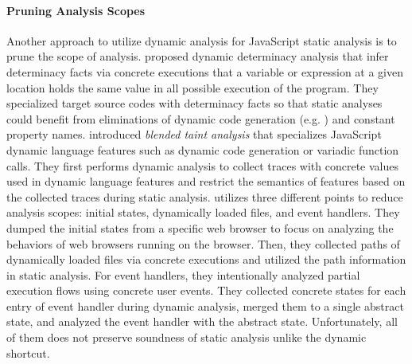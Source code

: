 \paragraph{Pruning Analysis Scopes}
Another approach to utilize dynamic analysis for JavaScript static analysis is
to prune the scope of analysis.  \citet{determinacy} proposed dynamic
determinacy analysis that infer determinacy facts via concrete executions that a
variable or expression at a given location holds the same value in all possible
execution of the program.  They specialized target source codes with determinacy
facts so that static analyses could benefit from eliminations of dynamic code
generation (e.g. ) and constant property names.  \citet{blended}
introduced \textit{blended taint analysis} that specializes JavaScript dynamic
language features such as dynamic code generation or variadic function calls.
They first performs dynamic analysis to collect traces with concrete values used
in dynamic language features and restrict the semantics of features based on the
collected traces during static analysis.  \citet{battles, eha} utilizes three
different points to reduce analysis scopes: initial states, dynamically loaded
files, and event handlers.  They dumped the initial states from a specific web
browser to focus on analyzing the behaviors of web browsers running on the
browser.  Then, they collected paths of dynamically loaded files via concrete
executions and utilized the path information in static analysis.  For event
handlers, they intentionally analyzed partial execution flows using concrete
user events.  They collected concrete states for each entry of event handler
during dynamic analysis, merged them to a single abstract state, and analyzed
the event handler with the abstract state.  Unfortunately, all of them does not
preserve soundness of static analysis unlike the dynamic shortcut.


% 

% 
